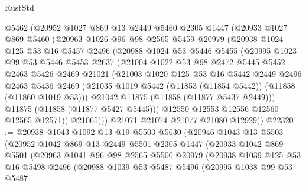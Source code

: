\begin{lexlean}{RustStd}
\begin{coremodule}
      @5462
      (@20952
        @1027
        @869
        @13
        @2449
        @5460
        @2305
        @1447
        (@20933
          @1027
          @869
          @5460
          (@20963
            @1026
            @96
            @98
            @2565
            @5459
            @20979
            (@20938
              @1024
              @125
              @53
              @16
              @5457
              @2496
              (@20988
                @1024
                @53
                @5446
                @5455
                (@20995
                  @1023
                  @99
                  @53
                  @5446
                  @5453
                  @2637
                  (@21004
                    @1022
                    @53
                    @98
                    @2472
                    @5445
                    @5452
                    @2463
                    @5426
                    @2469
                    @21021
                    (@21003
                      @1020
                      @125
                      @53
                      @16
                      @5442
                      @2449
                      @2496
                      @2463
                      @5436
                      @2469
                      (@21035 @1019 @5442 (@11853 (@11854 @5442)) (@11858 (@11860 @1019 @53)))
                      @21042
                      @11875
                      (@11858 (@11877 @5437 @2449)))
                    @11875
                    (@11858 (@11877 @5427 @5445)))
                  @12550
                  @12553
                  @12556
                  @12560
                  @12565
                  @12571))
              @21065)))
        @21071
        @21074
        @21077
        @21080
        @12929))
@22320 := @20938
    @1043
    @1092
    @13
    @19
    @5503
    @5630
    (@20946
      @1043
      @13
      @5503
      (@20952
        @1042
        @869
        @13
        @2449
        @5501
        @2305
        @1447
        (@20933
          @1042
          @869
          @5501
          (@20963
            @1041
            @96
            @98
            @2565
            @5500
            @20979
            (@20938
              @1039
              @125
              @53
              @16
              @5498
              @2496
              (@20988
                @1039
                @53
                @5487
                @5496
                (@20995
                  @1038
                  @99
                  @53
                  @5487

\end{coremodule}
\end{lexlean}
